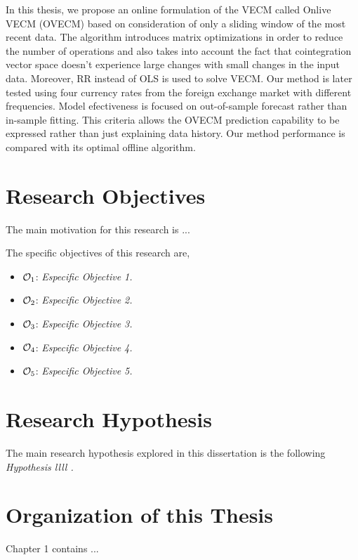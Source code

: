 In this thesis, we propose an online formulation of the VECM called Onlive VECM
(OVECM) based on consideration of only a sliding window of the most recent data.
The algorithm introduces matrix optimizations in order to reduce the number of
operations and also takes into account the fact that cointegration vector space
doesn't experience large changes with small changes in the input data. Moreover,
RR instead of OLS is used to solve VECM. Our method is later tested using four
currency rates from the foreign exchange market with different frequencies.  Model
efectiveness is focused on out-of-sample forecast rather than in-sample fitting.
This criteria allows the OVECM prediction capability to be expressed rather than
just explaining data history. Our method performance is compared with its
optimal offline algorithm.


\section{Research Objectives}
The main motivation for this research is ...

The specific objectives of this research are,
\begin{itemize}
\item $\Large \mathcal{O}_1$: \emph{Especific Objective 1.}
\item $\Large \mathcal{O}_2$: \emph{Especific Objective 2.}
\item $\Large \mathcal{O}_3$: \emph{Especific Objective 3.}
\item $\Large \mathcal{O}_4$: \emph{Especific Objective 4.}
\item $\Large \mathcal{O}_5$: \emph{Especific Objective 5.}
\end{itemize}


\section{Research Hypothesis}


The main research hypothesis explored in this dissertation is the following \\

\textit{Hypothesis llll . }

\section{Organization of this Thesis}

Chapter 1 contains ...
